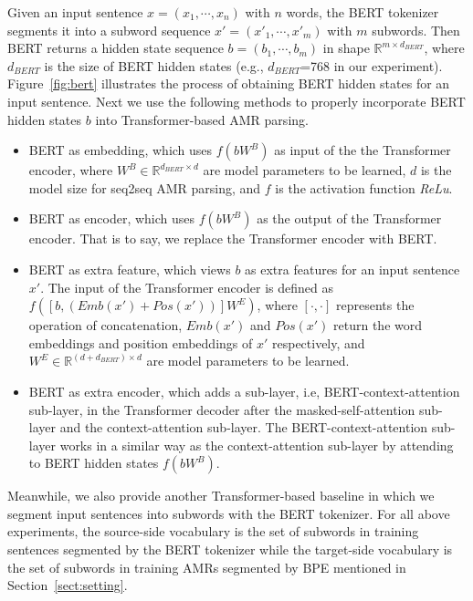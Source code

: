 \documentclass[11pt,a4paper]{article}
\begin{document}
Given an input sentence $x=\left(x_1, \cdots,x_n\right)$ with $n$ words, the BERT tokenizer segments it into a subword sequence $x'=\left(x'_1, \cdots,x'_m\right)$ with $m$ subwords. Then BERT returns a hidden state sequence $b=\left(b_1,\cdots,b_m\right)$ in shape $\mathbb{R}^{m\times d_{BERT}}$, where $d_{BERT}$ is the size of BERT hidden states (e.g., $d_{BERT}$=768 in our experiment). Figure~\ref{fig:bert} illustrates the process of obtaining BERT hidden states for an input sentence. Next we use the following methods to properly incorporate BERT hidden states $b$ into Transformer-based AMR parsing.

\begin{itemize}\item BERT as embedding, which uses $f\left(bW^B\right)$ as input of the the Transformer encoder, where $W^B \in \mathbb{R}^{d_{BERT}\times d}$ are model parameters to be learned, $d$ is the model size for seq2seq AMR parsing, and $f$ is the activation function \textit{ReLu}.
\item BERT as encoder, which uses $f\left(bW^B\right)$ as the output of the Transformer encoder. That is to say, we replace the Transformer encoder with BERT. 
\item BERT as extra feature, which views $b$ as extra features for an input sentence $x'$. The input of the Transformer encoder is defined as $f\left([b, \left(Emb\left(x'\right) + Pos\left(x'\right)\right)]W^E\right)$, where $[\cdot,\cdot]$ represents the operation of concatenation, $Emb\left(x'\right)$ and $Pos\left(x'\right)$ return the word embeddings and position embeddings of $x'$ respectively, and $W^E\in\mathbb{R}^{(d+d_{BERT})\times d}$ are model parameters to be learned.
\item BERT as extra encoder, which adds a sub-layer, i.e, BERT-context-attention sub-layer, in the Transformer decoder after the masked-self-attention sub-layer and the context-attention sub-layer. The BERT-context-attention sub-layer works in a similar way as the context-attention sub-layer by attending to BERT hidden states $f\left(bW^B\right)$.
\end{itemize}

Meanwhile, we also provide another Transformer-based baseline in which we segment input sentences into subwords with the BERT tokenizer. For all above experiments, the source-side vocabulary is the set of subwords in training sentences segmented by the BERT tokenizer while the target-side vocabulary is the set of subwords in training AMRs segmented by BPE mentioned in Section~\ref{sect:setting}.  
\end{document}
